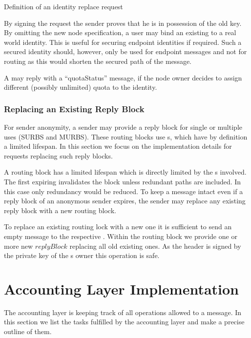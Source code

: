 \begin{lstfloat}[ht]
	
	\caption{Definition of an identity replace request}
	\label{fig:reqReplaceIdentity}
\end{lstfloat}

By signing the request the sender proves that he is in possession of the old key. By omitting the new node specification, a user may bind an existing  to a real world identity. This is useful for securing endpoint identities if required. Such a secured identity should, however, only be used for endpoint messages and not for routing as this would shorten the secured path of the message.

A \VortexNode{} may reply with a ``quotaStatus'' message, if the node owner decides to assign different (possibly unlimited) quota to the identity. 

\subsection{Replacing an Existing Reply Block\label{sec:replaceMURB}}
For sender anonymity, a sender may provide a reply block for single or multiple uses (SURBS and MURBS). These routing blocks use s, which have by definition a limited lifespan. In this section we focus on the implementation details for requests replacing such reply blocks.

A routing block has a limited lifespan which is directly limited by the s involved. The first expiring  invalidates the block unless redundant paths are included. In this case only redundancy would be reduced. To keep a message intact even if a reply block of an anonymous sender expires, the sender may replace any existing reply block with a new routing block.

To replace an existing routing lock with a new one it is sufficient to send an empty message to the respective . Within the routing block we provide one or more new $replyBlock$ replacing all old existing ones. As the header is signed by the private key of the s owner this operation is safe.

\chapter{Accounting Layer Implementation}
The accounting layer is keeping track of all operations allowed to a message. In this section we list the tasks fulfilled by the accounting layer and make a precise outline of them.

